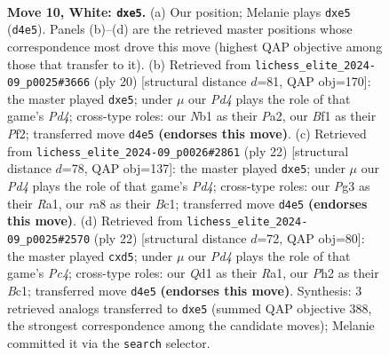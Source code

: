 \documentclass[11pt]{article}
\begin{document}
\clearpage

\begin{figure}[p]\centering
\begin{subfigure}{0.46\textwidth}\centering
\resizebox{\linewidth}{!}{%
\newchessgame
\chessboard[
  setfen={r1bqkb1r/1p2pppp/pnn5/4p3/3P4/5NP1/PP3P1P/RNBQKB1R w kq - 0 10},
  showmover=false,
  pgfstyle=straightmove, color=movearrow, markmove={d4-e5}
]}
\caption{}
\end{subfigure}\hfill
\begin{subfigure}{0.46\textwidth}\centering
\resizebox{\linewidth}{!}{%
\newchessgame
\chessboard[
  setfen={r1bqk2r/pp2bppp/2n1p3/4p3/2BP4/2P2N2/P4PPP/R1BQ1RK1 w kq - 0 11},
  showmover=false,
  pgfstyle=straightmove, color=movearrow, markmove={d4-e5}
]}
\caption{}
\end{subfigure}
\\[4pt]
\begin{subfigure}{0.46\textwidth}\centering
\resizebox{\linewidth}{!}{%
\newchessgame
\chessboard[
  setfen={r1bq1rk1/pp2ppbp/1nn3p1/4p3/3P4/1B3N1P/PP2QPP1/RNB2RK1 w - - 0 12},
  showmover=false,
  pgfstyle=straightmove, color=movearrow, markmove={d4-e5}
]}
\caption{}
\end{subfigure}\hfill
\begin{subfigure}{0.46\textwidth}\centering
\resizebox{\linewidth}{!}{%
\newchessgame
\chessboard[
  setfen={r1b2rk1/pp2bppp/1qn2n2/2pp4/2P5/5NP1/PP2QPBP/RNBR2K1 w - - 0 12},
  showmover=false,
  pgfstyle=straightmove, color=movearrow, markmove={c4-d5}
]}
\caption{}
\end{subfigure}
\caption{\textbf{Move 10, White: \texttt{dxe5}.} (a) Our position; Melanie plays \texttt{dxe5} (\texttt{d4e5}). Panels (b)--(d) are the retrieved master positions whose correspondence most drove this move (highest QAP objective among those that transfer to it). (b) Retrieved from \texttt{lichess\_elite\_2024-09\_p0025\#3666} (ply 20) [structural distance $d$=81, QAP obj=170]: the master played \texttt{dxe5}; under $\mu$ our \emph{Pd4} plays the role of that game's \emph{Pd4}; cross-type roles: our \emph{N}b1 as their \emph{P}a2, our \emph{B}f1 as their \emph{P}f2; transferred move \texttt{d4e5} \textbf{(endorses this move)}. (c) Retrieved from \texttt{lichess\_elite\_2024-09\_p0026\#2861} (ply 22) [structural distance $d$=78, QAP obj=137]: the master played \texttt{dxe5}; under $\mu$ our \emph{Pd4} plays the role of that game's \emph{Pd4}; cross-type roles: our \emph{P}g3 as their \emph{R}a1, our \emph{r}a8 as their \emph{B}c1; transferred move \texttt{d4e5} \textbf{(endorses this move)}. (d) Retrieved from \texttt{lichess\_elite\_2024-09\_p0025\#2570} (ply 22) [structural distance $d$=72, QAP obj=80]: the master played \texttt{cxd5}; under $\mu$ our \emph{Pd4} plays the role of that game's \emph{Pc4}; cross-type roles: our \emph{Q}d1 as their \emph{R}a1, our \emph{P}h2 as their \emph{B}c1; transferred move \texttt{d4e5} \textbf{(endorses this move)}. Synthesis: 3 retrieved analogs transferred to \texttt{dxe5} (summed QAP objective 388, the strongest correspondence among the candidate moves); Melanie committed it via the \texttt{search} selector.}
\label{fig:thought-m18}
\end{figure}
\end{document}
